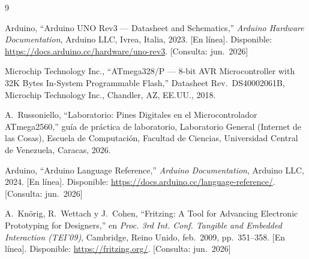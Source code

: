 \begingroup
\small
\begin{thebibliography}{9}

Arduino, ``Arduino UNO Rev3 --- Datasheet and Schematics,''
\emph{Arduino Hardware Documentation}, Arduino LLC, Ivrea, Italia, 2023.
[En línea]. Disponible: \url{https://docs.arduino.cc/hardware/uno-rev3}.
[Consulta: jun.~2026]

Microchip Technology Inc., ``ATmega328/P --- 8-bit AVR Microcontroller with
32K Bytes In-System Programmable Flash,'' Datasheet Rev.~DS40002061B,
Microchip Technology Inc., Chandler, AZ, EE.UU., 2018.

A.~Russoniello, ``Laboratorio: Pines Digitales en el Microcontrolador
ATmega2560,'' guía de práctica de laboratorio, Laboratorio General
(Internet de las Cosas), Escuela de Computación, Facultad de Ciencias,
Universidad Central de Venezuela, Caracas, 2026.

Arduino, ``Arduino Language Reference,'' \emph{Arduino Documentation},
Arduino LLC, 2024. [En línea]. Disponible:
\url{https://docs.arduino.cc/language-reference/}. [Consulta: jun.~2026]

A.~Knörig, R.~Wettach y J.~Cohen, ``Fritzing: A Tool for Advancing
Electronic Prototyping for Designers,'' en \emph{Proc. 3rd Int. Conf.
Tangible and Embedded Interaction (TEI'09)}, Cambridge, Reino Unido,
feb.~2009, pp.~351--358. [En línea]. Disponible: \url{https://fritzing.org/}.
[Consulta: jun.~2026]

\end{thebibliography}
\endgroup

